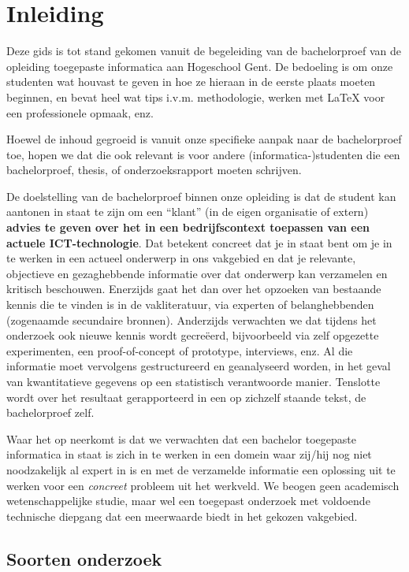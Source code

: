 \chapter{Inleiding}
\label{ch:inleiding}

Deze gids is tot stand gekomen vanuit de begeleiding van de bachelorproef van de opleiding toegepaste informatica aan Hogeschool Gent. De bedoeling is om onze studenten wat houvast te geven in hoe ze hieraan in de eerste plaats moeten beginnen, en bevat heel wat tips i.v.m. methodologie, werken met {\LaTeX} voor een professionele opmaak, enz.

Hoewel de inhoud gegroeid is vanuit onze specifieke aanpak naar de bachelorproef toe, hopen we dat die ook relevant is voor andere (informatica-)studenten die een bachelorproef, thesis, of onderzoeksrapport moeten schrijven.

De doelstelling van de bachelorproef binnen onze opleiding is dat de student kan aantonen in staat te zijn om een ``klant'' (in de eigen organisatie of extern) \textbf{advies te geven over het in een bedrijfscontext toepassen van een actuele ICT-technologie}. Dat betekent concreet dat je in staat bent om je in te werken in een actueel onderwerp in ons vakgebied en dat je relevante, objectieve en gezaghebbende informatie over dat onderwerp kan verzamelen en kritisch beschouwen. Enerzijds gaat het dan over het opzoeken van bestaande kennis die te vinden is in de vakliteratuur, via experten of belanghebbenden (zogenaamde secundaire bronnen). Anderzijds verwachten we dat tijdens het onderzoek ook nieuwe kennis wordt gecreëerd, bijvoorbeeld via zelf opgezette experimenten, een proof-of-concept of prototype, interviews, enz. Al die informatie moet vervolgens gestructureerd en geanalyseerd worden, in het geval van kwantitatieve gegevens op een statistisch verantwoorde manier. Tenslotte wordt over het resultaat gerapporteerd in een op zichzelf staande tekst, de bachelorproef zelf.

Waar het op neerkomt is dat we verwachten dat een bachelor toegepaste informatica in staat is zich in te werken in een domein waar zij/hij nog niet noodzakelijk al expert in is en met de verzamelde informatie een oplossing uit te werken voor een \emph{concreet} probleem uit het werkveld. We beogen geen academisch wetenschappelijke studie, maar wel een toegepast onderzoek met voldoende technische diepgang dat een meerwaarde biedt in het gekozen vakgebied.

\section{Soorten onderzoek}
\label{sec:soorten-onderzoek}

